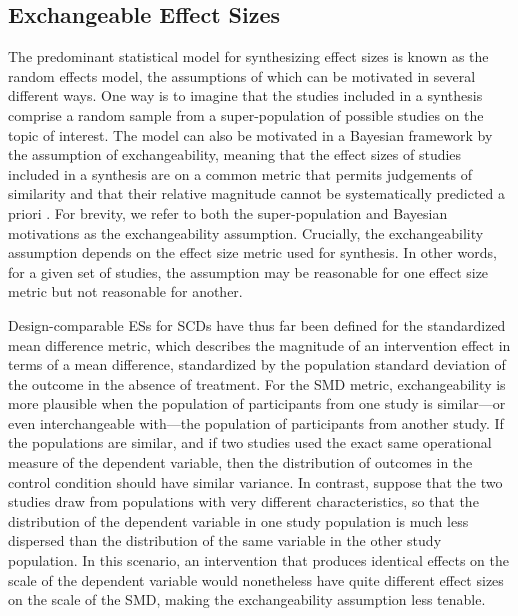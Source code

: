 \documentclass[
]{book}
\begin{document}
\hypertarget{exchangeable-effect-sizes}{%
\subsection{Exchangeable Effect Sizes}\label{exchangeable-effect-sizes}}

The predominant statistical model for synthesizing effect sizes is known as the random effects model, the assumptions of which can be motivated in several different ways. One way is to imagine that the studies included in a synthesis comprise a random sample from a super-population of possible studies on the topic of interest. The model can also be motivated in a Bayesian framework by the assumption of exchangeability, meaning that the effect sizes of studies included in a synthesis are on a common metric that permits judgements of similarity and that their relative magnitude cannot be systematically predicted a priori \citep{higgins2009reevaluation}. For brevity, we refer to both the super-population and Bayesian motivations as the exchangeability assumption. Crucially, the exchangeability assumption depends on the effect size metric used for synthesis. In other words, for a given set of studies, the assumption may be reasonable for one effect size metric but not reasonable for another.

Design-comparable ESs for SCDs have thus far been defined for the standardized mean difference metric, which describes the magnitude of an intervention effect in terms of a mean difference, standardized by the population standard deviation of the outcome in the absence of treatment. For the SMD metric, exchangeability is more plausible when the population of participants from one study is similar---or even interchangeable with---the population of participants from another study. If the populations are similar, and if two studies used the exact same operational measure of the dependent variable, then the distribution of outcomes in the control condition should have similar variance. In contrast, suppose that the two studies draw from populations with very different characteristics, so that the distribution of the dependent variable in one study population is much less dispersed than the distribution of the same variable in the other study population. In this scenario, an intervention that produces identical effects on the scale of the dependent variable would nonetheless have quite different effect sizes on the scale of the SMD, making the exchangeability assumption less tenable.
\end{document}

